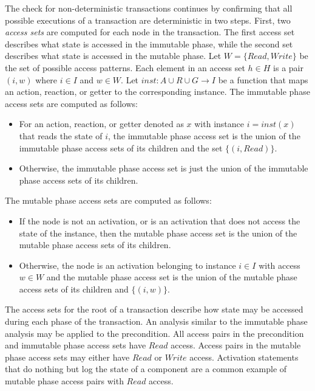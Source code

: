 The check for non-deterministic transactions continues by confirming that all possible executions of a transaction are deterministic in two steps.
First, two \emph{access sets} are computed for each node in the transaction.
The first access set describes what state is accessed in the immutable phase, while the second set describes what state is accessed in the mutable phase.
Let $W = \{ \mathit{Read}, \mathit{Write} \}$ be the set of possible access patterns.
Each element in an access set $h \in H$ is a pair $(i,w)$ where $i \in I$ and $w \in W$.
Let $\mathit{inst}: A \cup R \cup G \to I$ be a function that maps an action, reaction, or getter to the corresponding instance.
The immutable phase access sets are computed as follows:
\begin{itemize}
  \item For an action, reaction, or getter denoted as $x$ with instance $i = \mathit{inst}(x)$ that reads the state of $i$, the immutable phase access set is the union of the immutable phase access sets of its children and the set $\{ (i, \mathit{Read}) \}$.
  \item Otherwise, the immutable phase access set is just the union of the immutable phase access sets of its children.
\end{itemize}
The mutable phase access sets are computed as follows:
\begin{itemize}
  \item If the node is not an activation, or is an activation that does not access the state of the instance, then the mutable phase access set is the union of the mutable phase access sets of its children.
  \item Otherwise, the node is an activation belonging to instance $i \in I$ with access $w \in W$ and the mutable phase access set is the union of the mutable phase access sets of its children and $\{ (i, w) \}$.
\end{itemize}
The access sets for the root of a transaction describe how state may be accessed during each phase of the transaction.
An analysis similar to the immutable phase analysis may be applied to the precondition.
All access pairs in the precondition and immutable phase access sets have $\mathit{Read}$ access.
Access pairs in the mutable phase access sets may either have $\mathit{Read}$ or $\mathit{Write}$ access.
Activation statements that do nothing but log the state of a component are a common example of mutable phase access pairs with $\mathit{Read}$ access.

